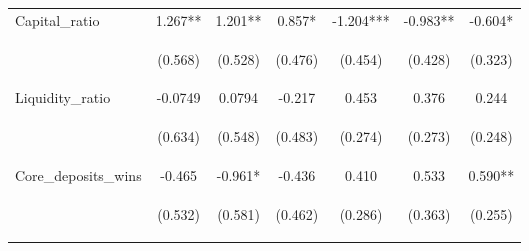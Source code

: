 \documentclass[]{article}
\begin{document}
\begin{center}
\begin{tabular}{lcccccc}
Capital\_ratio & 1.267** & 1.201** & 0.857* & -1.204*** & -0.983** & -0.604* \\
\vspace{4pt} & \begin{footnotesize}(0.568)\end{footnotesize} & \begin{footnotesize}(0.528)\end{footnotesize} & \begin{footnotesize}(0.476)\end{footnotesize} & \begin{footnotesize}(0.454)\end{footnotesize} & \begin{footnotesize}(0.428)\end{footnotesize} & \begin{footnotesize}(0.323)\end{footnotesize} \\
Liquidity\_ratio & -0.0749 & 0.0794 & -0.217 & 0.453 & 0.376 & 0.244 \\
\vspace{4pt} & \begin{footnotesize}(0.634)\end{footnotesize} & \begin{footnotesize}(0.548)\end{footnotesize} & \begin{footnotesize}(0.483)\end{footnotesize} & \begin{footnotesize}(0.274)\end{footnotesize} & \begin{footnotesize}(0.273)\end{footnotesize} & \begin{footnotesize}(0.248)\end{footnotesize} \\
Core\_deposits\_wins & -0.465 & -0.961* & -0.436 & 0.410 & 0.533 & 0.590** \\
\vspace{4pt} & \begin{footnotesize}(0.532)\end{footnotesize} & \begin{footnotesize}(0.581)\end{footnotesize} & \begin{footnotesize}(0.462)\end{footnotesize} & \begin{footnotesize}(0.286)\end{footnotesize} & \begin{footnotesize}(0.363)\end{footnotesize} & \begin{footnotesize}(0.255)\end{footnotesize} \\

\end{tabular}
\end{center}
\end{document}
